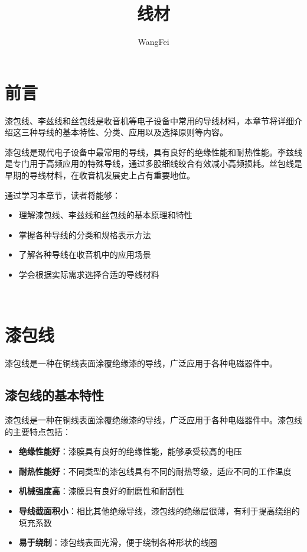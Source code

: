 \documentclass[12pt,UTF8]{ctexbook}
\title{\heiti\zihao{0} 线材}
\author{WangFei}
\date{}
\begin{document}
\maketitle
\tableofcontents

\frontmatter
\chapter{前言}

漆包线、李兹线和丝包线是收音机等电子设备中常用的导线材料，本章节将详细介绍这三种导线的基本特性、分类、应用以及选择原则等内容。

漆包线是现代电子设备中最常用的导线，具有良好的绝缘性能和耐热性能。李兹线是专门用于高频应用的特殊导线，通过多股细线绞合有效减小高频损耗。丝包线是早期的导线材料，在收音机发展史上占有重要地位。

通过学习本章节，读者将能够：

\begin{itemize}[leftmargin=2cm]
    \item 理解漆包线、李兹线和丝包线的基本原理和特性
    \item 掌握各种导线的分类和规格表示方法
    \item 了解各种导线在收音机中的应用场景
    \item 学会根据实际需求选择合适的导线材料
\end{itemize}

\mainmatter

~\\

\chapter{漆包线}

漆包线是一种在铜线表面涂覆绝缘漆的导线，广泛应用于各种电磁器件中。

\section{漆包线的基本特性}

漆包线是一种在铜线表面涂覆绝缘漆的导线，广泛应用于各种电磁器件中。漆包线的主要特点包括：

\begin{itemize}[leftmargin=2cm]
    \item \textbf{绝缘性能好}：漆膜具有良好的绝缘性能，能够承受较高的电压
    \item \textbf{耐热性能好}：不同类型的漆包线具有不同的耐热等级，适应不同的工作温度
    \item \textbf{机械强度高}：漆膜具有良好的耐磨性和耐刮性
    \item \textbf{导线截面积小}：相比其他绝缘导线，漆包线的绝缘层很薄，有利于提高绕组的填充系数
    \item \textbf{易于绕制}：漆包线表面光滑，便于绕制各种形状的线圈
\end{itemize}
\end{document}
